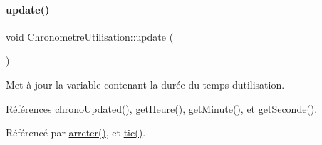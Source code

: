 \paragraph{\texorpdfstring{update()}{update()}}
{\footnotesize\ttfamily void Chronometre\+Utilisation\+::update (\begin{DoxyParamCaption}{ }\end{DoxyParamCaption})\hspace{0.3cm}{\ttfamily [private]}}

Met à jour la variable contenant la durée du temps d\textquotesingle{}utilisation. 

Références \hyperlink{class_chronometre_utilisation_ae4e197f888e33feb23801d2edcf2c4a5}{chrono\+Updated()}, \hyperlink{class_chronometre_utilisation_a03c732560e07a2014129a7da8bb2307b}{get\+Heure()}, \hyperlink{class_chronometre_utilisation_a2c137076fcda83a14a5bad01b915196f}{get\+Minute()}, et \hyperlink{class_chronometre_utilisation_a62dde8f710b8e015ba6124e8b44fe2da}{get\+Seconde()}.



Référencé par \hyperlink{class_chronometre_utilisation_a938c4c86a6b33eaf60af7be81ee7ec32}{arreter()}, et \hyperlink{class_chronometre_utilisation_ab8dc7eb855ec9e24daefa4e185051d2e}{tic()}.


